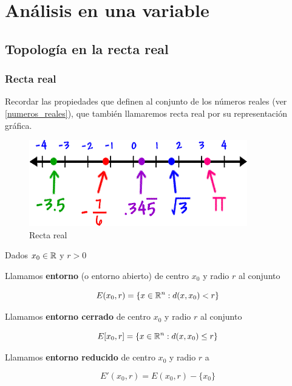 %
%
%
 
\part{Análisis en una variable}

\chapter{Topología en la recta real}

\section{Recta real}

Recordar las propiedades que definen al conjunto de los números reales (ver \ref{numeros_reales}), que también llamaremos recta real por su representación gráfica.

\begin{figure}[h]
\centering\includegraphics[scale=0.6]{images/03_analisis1/number_line.png}
\caption{Recta real}
\end{figure}

\begin{definition}[Entorno] \label{entorno_real}
Dados $x_0 \in \mathbb{R}$ y $r > 0$ 
	
Llamamos \textbf{entorno}  (o entorno abierto) de centro $x_0$ y radio $r$ al conjunto
	
$$ E(x_0,r) = \{ x \in \mathbb{R}^n : d(x,x_0) < r\} $$
	
Llamamos \textbf{entorno cerrado} de centro $x_0$ y radio $r$ al conjunto
	
$$ E[x_0,r] = \{ x \in \mathbb{R}^n : d(x,x_0) \leq r\} $$
	
Llamamos \textbf{entorno reducido} de centro $x_0$ y radio $r$ a 
	
$$ E'(x_0,r) = E(x_0,r) - \{x_0\}$$
\end{definition}


